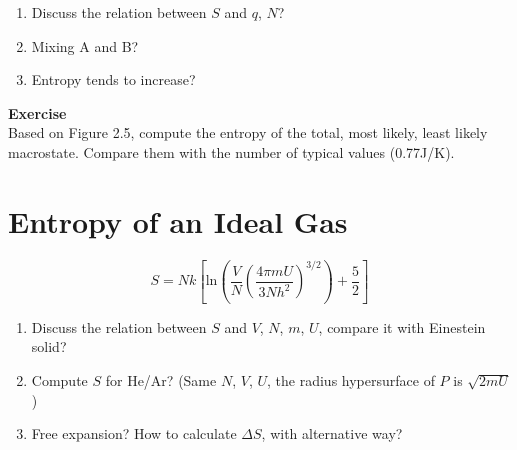 \documentclass[twoside]{article}
\begin{document}
\begin{enumerate}
\item Discuss the relation between $S$ and $q$, $N$?
\item Mixing A and B?
\item Entropy tends to increase?
\end{enumerate}

{\bf Exercise} \\
Based on Figure 2.5, compute the entropy of the total, most likely, least likely macrostate. Compare them with the number of typical values (0.77J/K).

\section{Entropy of an Ideal Gas}
\begin{equation} \label{entropy} 
S = Nk[\text{ln}(\frac{V}{N} (\frac{4\pi m U}{3Nh^2})^{3/2}) + \frac{5}{2}]
\end{equation}

\begin{enumerate}
\item Discuss the relation between $S$ and $V$, $N$, $m$, $U$, compare it with Einestein solid?
\item Compute $S$ for He/Ar? (Same $N$, $V$, $U$, the radius hypersurface of $P$ is $\sqrt{2mU}$ ) 
\item Free expansion? How to calculate $\Delta{S}$, with alternative way?
\end{enumerate}

\begin{figure}[h]
\centering
{}
\end{figure}
\end{document}
